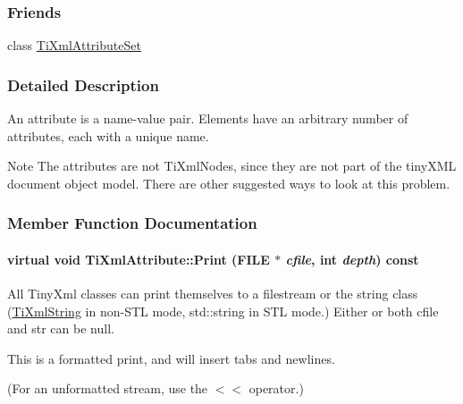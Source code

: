 \subsubsection*{Friends}
\begin{DoxyCompactItemize}
\item 
\hypertarget{class_ti_xml_attribute_a35a7b7f89f708527677d5078d41ce0bf}{
class \hyperlink{class_ti_xml_attribute_a35a7b7f89f708527677d5078d41ce0bf}{TiXmlAttributeSet}}
\label{class_ti_xml_attribute_a35a7b7f89f708527677d5078d41ce0bf}

\end{DoxyCompactItemize}


\subsubsection{Detailed Description}
An attribute is a name-\/value pair. Elements have an arbitrary number of attributes, each with a unique name.

\begin{DoxyNote}{Note}
The attributes are not TiXmlNodes, since they are not part of the tinyXML document object model. There are other suggested ways to look at this problem. 
\end{DoxyNote}


\subsubsection{Member Function Documentation}
\hypertarget{class_ti_xml_attribute_acc04956c1d5c4c31fe74f7a7528d109a}{
\paragraph[{Print}]{\setlength{\rightskip}{0pt plus 5cm}virtual void TiXmlAttribute::Print (FILE $\ast$ {\em cfile}, \/  int {\em depth}) const}\hfill}
\label{class_ti_xml_attribute_acc04956c1d5c4c31fe74f7a7528d109a}
All TinyXml classes can print themselves to a filestream or the string class (\hyperlink{class_ti_xml_string}{TiXmlString} in non-\/STL mode, std::string in STL mode.) Either or both cfile and str can be null.

This is a formatted print, and will insert tabs and newlines.

(For an unformatted stream, use the $<$$<$ operator.) 

